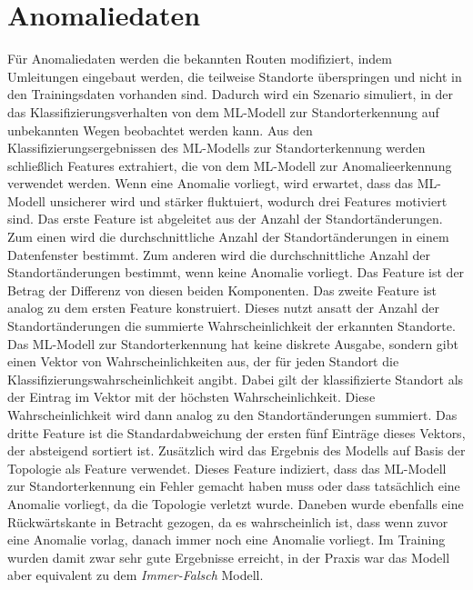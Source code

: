 \section{Anomaliedaten}
\label{sec:data_anomalie}
Für Anomaliedaten werden die bekannten Routen modifiziert, indem Umleitungen eingebaut werden, die teilweise Standorte überspringen
und nicht in den Trainingsdaten vorhanden sind.
Dadurch wird ein Szenario simuliert, in der das Klassifizierungsverhalten von dem ML-Modell zur Standorterkennung auf unbekannten Wegen beobachtet werden kann.
Aus den Klassifizierungsergebnissen des ML-Modells zur Standorterkennung werden schließlich Features extrahiert,
die von dem ML-Modell zur Anomalieerkennung verwendet werden.
\newline
\newline
Wenn eine Anomalie vorliegt, wird erwartet, dass das ML-Modell unsicherer wird und stärker fluktuiert,
wodurch drei Features motiviert sind.
Das erste Feature ist abgeleitet aus der Anzahl der Standortänderungen.
Zum einen wird die durchschnittliche Anzahl der Standortänderungen in einem Datenfenster bestimmt.
Zum anderen wird die durchschnittliche Anzahl der Standortänderungen bestimmt, wenn keine Anomalie vorliegt.
Das Feature ist der Betrag der Differenz von diesen beiden Komponenten.
\newpage
Das zweite Feature ist analog zu dem ersten Feature konstruiert.
Dieses nutzt ansatt der Anzahl der Standortänderungen die summierte Wahrscheinlichkeit der erkannten Standorte.
Das ML-Modell zur Standorterkennung hat keine diskrete Ausgabe, sondern gibt einen Vektor von Wahrscheinlichkeiten aus,
der für jeden Standort die Klassifizierungswahrscheinlichkeit angibt.
Dabei gilt der klassifizierte Standort als der Eintrag im Vektor mit der höchsten Wahrscheinlichkeit.
Diese Wahrscheinlichkeit wird dann analog zu den Standortänderungen summiert.
Das dritte Feature ist die Standardabweichung der ersten fünf Einträge dieses Vektors, der absteigend sortiert ist.
\newline
\newline
Zusätzlich wird das Ergebnis des Modells auf Basis der Topologie als Feature verwendet.
Dieses Feature indiziert, dass das ML-Modell zur Standorterkennung ein Fehler gemacht haben muss
oder dass tatsächlich eine Anomalie vorliegt, da die Topologie verletzt wurde.
\newline
\newline
Daneben wurde ebenfalls eine Rückwärtskante in Betracht gezogen,
da es wahrscheinlich ist, dass wenn zuvor eine Anomalie vorlag, danach immer noch eine Anomalie vorliegt.
Im Training wurden damit zwar sehr gute Ergebnisse erreicht,
in der Praxis war das Modell aber equivalent zu dem \textit{Immer-Falsch} Modell.
